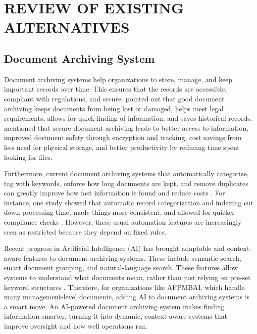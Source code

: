 \section{REVIEW OF EXISTING ALTERNATIVES}
\subsection{Document Archiving System}

Document archiving systems help organizations to store, manage, and keep important records over time. This ensures that the records are accessible, compliant with regulations, and secure. \cite{Quantanite_2023} pointed out that good document archiving keeps documents from being lost or damaged, helps meet legal requirements, allows for quick finding of information, and saves historical records. \cite{Docsuite2023} mentioned that secure document archiving leads to better access to information, improved document safety through encryption and tracking, cost savings from less need for physical storage, and better productivity by reducing time spent looking for files.

Furthermore, current document archiving systems that automatically categorize, tag with keywords, enforce how long documents are kept, and remove duplicates can greatly improve how fast information is found and reduce costs \citep{AICR2025}. For instance, one study showed that automatic record categorization and indexing cut down processing time, made things more consistent, and allowed for quicker compliance checks \citep{RecordsKeeper2025}. However, these usual automation features are increasingly seen as restricted because they depend on fixed rules.

Recent progress in Artificial Intelligence (AI) has brought adaptable and context-aware features to document archiving systems. These include semantic search, smart document grouping, and natural-language search. These features allow systems to understand what documents mean, rather than just relying on pre-set keyword structures \citep{Mahadevkar2024}. Therefore, for organizations like AFPMBAI, which handle many management-level documents, adding AI to document archiving systems is a smart move. An AI-powered document archiving system makes finding information smarter, turning it into dynamic, context-aware systems that improve oversight and how well operations run.




